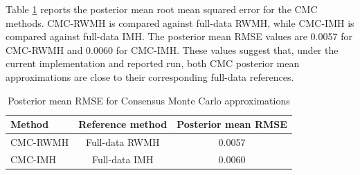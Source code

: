 \begin{table}[htbp]
\centering
\caption{Comparison of posterior means across Bayesian methods}
\label{tab:posterior_mean_comparison}
\scriptsize
{}
\end{table}

Table \ref{tab:cmc_rmse} reports the posterior mean root mean squared error for the CMC methods. CMC-RWMH is compared against full-data RWMH, while CMC-IMH is compared against full-data IMH. The posterior mean RMSE values are 0.0057 for CMC-RWMH and 0.0060 for CMC-IMH. These values suggest that, under the current implementation and reported run, both CMC posterior mean approximations are close to their corresponding full-data references.

\begin{table}[htbp]
\centering
\caption{Posterior mean RMSE for Consensus Monte Carlo approximations}
\label{tab:cmc_rmse}
\begin{tabular}{lcc}
\hline
Method & Reference method & Posterior mean RMSE \\
\hline
CMC-RWMH & Full-data RWMH & 0.0057 \\
CMC-IMH & Full-data IMH & 0.0060 \\
\hline
\end{tabular}
\end{table}

